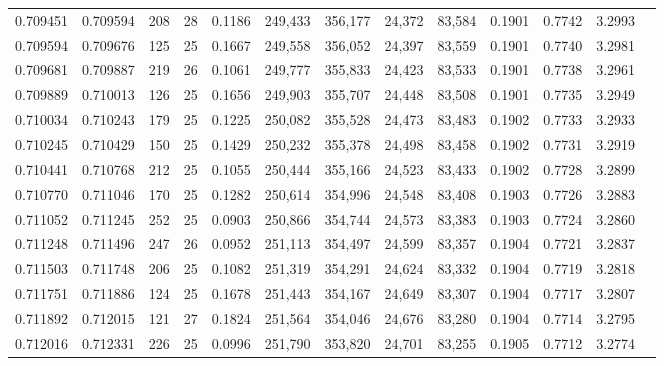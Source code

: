 \begin{tabular}{rrrrrrrrrrrrr}
0.709451 & 0.709594 &   208 &  28 &                                     0.1186 & 249,433 & 356,177 &  24,372 &  83,584 & 0.1901 & 0.7742 & 3.2993 \\
0.709594 & 0.709676 &   125 &  25 &                                     0.1667 & 249,558 & 356,052 &  24,397 &  83,559 & 0.1901 & 0.7740 & 3.2981 \\
0.709681 & 0.709887 &   219 &  26 &                                     0.1061 & 249,777 & 355,833 &  24,423 &  83,533 & 0.1901 & 0.7738 & 3.2961 \\
0.709889 & 0.710013 &   126 &  25 &                                     0.1656 & 249,903 & 355,707 &  24,448 &  83,508 & 0.1901 & 0.7735 & 3.2949 \\
0.710034 & 0.710243 &   179 &  25 &                                     0.1225 & 250,082 & 355,528 &  24,473 &  83,483 & 0.1902 & 0.7733 & 3.2933 \\
0.710245 & 0.710429 &   150 &  25 &                                     0.1429 & 250,232 & 355,378 &  24,498 &  83,458 & 0.1902 & 0.7731 & 3.2919 \\
0.710441 & 0.710768 &   212 &  25 &                                     0.1055 & 250,444 & 355,166 &  24,523 &  83,433 & 0.1902 & 0.7728 & 3.2899 \\
0.710770 & 0.711046 &   170 &  25 &                                     0.1282 & 250,614 & 354,996 &  24,548 &  83,408 & 0.1903 & 0.7726 & 3.2883 \\
0.711052 & 0.711245 &   252 &  25 &                                     0.0903 & 250,866 & 354,744 &  24,573 &  83,383 & 0.1903 & 0.7724 & 3.2860 \\
0.711248 & 0.711496 &   247 &  26 &                                     0.0952 & 251,113 & 354,497 &  24,599 &  83,357 & 0.1904 & 0.7721 & 3.2837 \\
0.711503 & 0.711748 &   206 &  25 &                                     0.1082 & 251,319 & 354,291 &  24,624 &  83,332 & 0.1904 & 0.7719 & 3.2818 \\
0.711751 & 0.711886 &   124 &  25 &                                     0.1678 & 251,443 & 354,167 &  24,649 &  83,307 & 0.1904 & 0.7717 & 3.2807 \\
0.711892 & 0.712015 &   121 &  27 &                                     0.1824 & 251,564 & 354,046 &  24,676 &  83,280 & 0.1904 & 0.7714 & 3.2795 \\
0.712016 & 0.712331 &   226 &  25 &                                     0.0996 & 251,790 & 353,820 &  24,701 &  83,255 & 0.1905 & 0.7712 & 3.2774 \\

\end{tabular}
